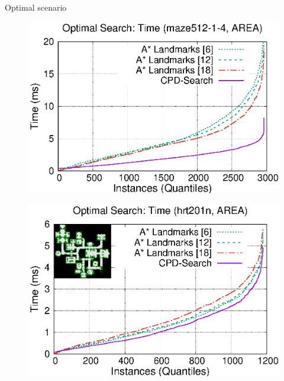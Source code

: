 \begin{frame}{Optimal scenario}
    \begin{adjustwidth}{-2.5em}{-2.5em}
        \begin{minipage}{0.59\textwidth}
            \begin{figure}
                \centering
                \includegraphics[width=1.0\textwidth]{src/images/optimal/maze512-1-4}
                \label{fig:optimal-maze512-1-4}
            \end{figure}
        \end{minipage}%
        \begin{minipage}{0.59\textwidth}
            \begin{figure}
                \centering
                \includegraphics[width=1.0\textwidth]{src/images/optimal/hrt201n}
                \label{fig:optimal-hrt201n}
            \end{figure}
        \end{minipage}
    \end{adjustwidth}
\end{frame}

